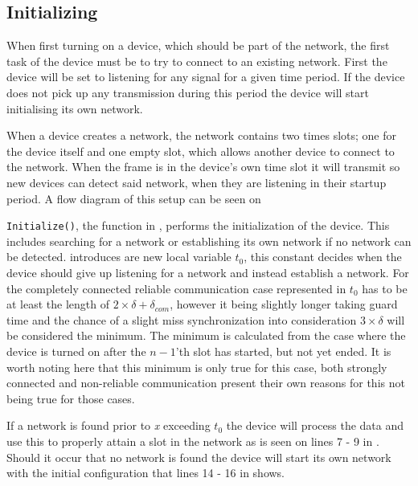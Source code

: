 \subsection{Initializing} %
\label{sub:setupCCRC} 
When first turning on a device, which should be part of the network, the first task of the device must be to try to connect to an existing network.
First the device will be set to listening for any signal for a given time period. 
If the device does not pick up any transmission during this period the device will start initialising its own network.

When a device creates a network, the network contains two times slots; one for the device itself and one empty slot, which allows another device to connect to the network.
When the frame is in the device's own time slot it will transmit so new devices can detect said network, when they are listening in their startup period.  
A flow diagram of this setup can be seen on 

 
\bigskip \noindent
\texttt{Initialize()}, the function in , performs the initialization of the device.
This includes searching for a network or establishing its own network if no network can be detected.
 introduces are new local variable $t_0$, this constant decides when the device should give up listening for a network and instead establish a network.
For the completely connected reliable communication case represented in  $t_0$ has to be at least the length of $2 \times \delta + \delta_{com}$, however it being slightly longer taking guard time and the chance of a slight miss synchronization into consideration $3 \times \delta$ will be considered the minimum.
The minimum is calculated from the case where the device is turned on after the $n-1$'th slot has started, but not yet ended.
It is worth noting here that this minimum is only true for this case, both strongly connected and non-reliable communication present their own reasons for this not being true for those cases.

If a network is found prior to \textit{x} exceeding $t_0$ the device will process the data and use this to properly attain a slot in the network as is seen on lines 7 - 9 in .
Should it occur that no network is found the device will start its own network with the initial configuration that lines 14 - 16 in  shows.

